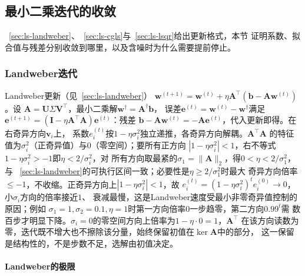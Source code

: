 \subsection{最小二乘迭代的收敛}
\label{sec:ls-least-squares-iteration-convergence}
\label{sec:linear-algebra-iteration-convergence}
\label{sec:ch06-gradient-convergence}

~\ref{sec:ls-landweber}、~\ref{sec:ls-cgls}与~\ref{sec:ls-lsqr}给出更新格式，本节
证明系数、拟合值与残差分别收敛到哪里，以及含噪时为什么需要提前停止。

\subsubsection{Landweber迭代}

Landweber更新（见~\ref{sec:ls-landweber}）
$\bm w^{(t+1)}=\bm w^{(t)}+\eta\bm A^{\top}(\bm b-\bm A\bm w^{(t)})$。设
$\bm A=\bm U\Sigma\bm V^{\top}$，最小二乘解$\bm w^\dagger=\bm A^\dagger\bm b$，
误差$\bm e^{(t)}=\bm w^{(t)}-\bm w^\dagger$满足
$\bm e^{(t+1)}=(\bm I-\eta\bm A^{\top}\bm A)\bm e^{(t)}$：残差
$\bm b-\bm A\bm w^{(t)}=-\bm A\bm e^{(t)}$，代入更新即得。在右奇异方向$\bm v_i$上，
系数$e_i^{(t)}$按$1-\eta\sigma_i^2$独立递推，各奇异方向解耦。$\bm A^{\top}\bm A$
的特征值为$\sigma_i^2$（正奇异值）与$0$（零空间）；要所有正方向
$|1-\eta\sigma_i^2|<1$，右不等式$1-\eta\sigma_i^2>-1$即$\eta<2/\sigma_i^2$，对
所有方向取最紧的$\sigma_1=\lVert\bm A\rVert_2$，得$0<\eta<2/\sigma_1^2$，与
~\ref{sec:ls-landweber}的可执行区间一致；必要性是$\eta\geq2/\sigma_1^2$时最大
奇异方向倍率$\leq-1$，不收缩。正奇异方向上$|1-\eta\sigma_i^2|<1$，故
$e_i^{(t)}=(1-\eta\sigma_i^2)^t e_i^{(0)}\to0$，小$\sigma_i$方向的倍率接近$1$、
衰减最慢，这是Landweber速度受最小非零奇异值控制的原因；例如
$\sigma_1=1,\sigma_2=0.1,\eta=1$时第一方向倍率$0$一步趋零，第二方向$0.99^t$需
数百步才明显下降。$\sigma_i=0$的零空间方向上倍率为$1-\eta\cdot0=1$，$\bm A^{\top}$
在该方向读数为零，迭代既不增大也不擦除该分量，始终保留初值在$\ker\bm A$中的部分，
这一保留是结构性的，不是步数不足，选解由初值决定。

\paragraph{Landweber的极限}

